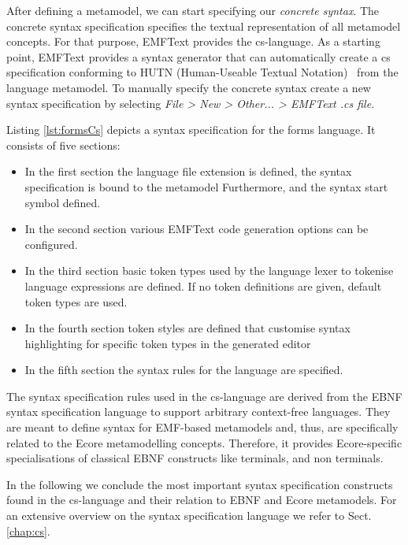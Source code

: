 After defining a metamodel, we can start specifying our
\emph{concrete syntax}. The concrete syntax specification specifies 
the textual representation of all metamodel
concepts. For that purpose, EMFText provides the cs-language. 
As a starting point, EMFText provides a syntax generator that can
automatically create a cs specification conforming to HUTN (Human-Useable
Textual Notation)~\cite{HUTN} from the language metamodel. 
To manually specify the concrete syntax create a
new syntax specification by selecting \emph{File > New > Other... > EMFText .cs
file}.

\noindent Listing \ref{lst:formsCs} depicts a syntax specification for the forms
language. It consists of five sections: 
\begin{itemize}
  \item In the first section the language file
	extension is defined, the syntax specification is bound to the metamodel
	Furthermore, and the syntax start symbol defined.
  \item In the second section various EMFText code generation options can be
  	configured.
  \item  In the third section basic token types used by the language
  	lexer to tokenise language expressions are defined. If no token definitions
 	are given, default token types are used. 	
  \item In the fourth section token styles are defined that customise syntax
  	highlighting for specific token types in the generated editor
  \item In the fifth section the syntax rules for the language are specified.	
\end{itemize}

	The syntax specification rules used in the cs-language are derived from the
	EBNF syntax specification language to support arbitrary context-free languages.
	They are meant to define syntax for EMF-based metamodels and, thus, are
	specifically related to the Ecore metamodelling concepts. Therefore, it provides
	Ecore-specific specialisations of classical EBNF constructs like terminals, and
	non terminals.


	In the following we conclude the most important syntax specification
	constructs found in the cs-language and their relation to EBNF and Ecore
	metamodels. For an extensive overview on the syntax specification language we
	refer to Sect. \ref{chap:cs}.

